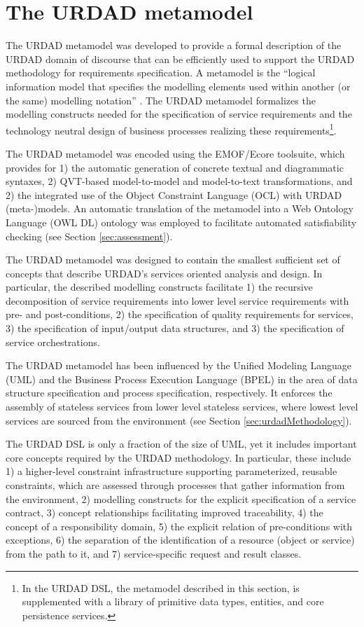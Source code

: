 \section{The URDAD metamodel \label{sec:metamodel}}

The URDAD metamodel was developed to provide a formal description of the URDAD domain of discourse that can be efficiently used to support the URDAD methodology for requirements specification. A metamodel is the ``logical information model that specifies the modelling elements used within another (or the same) modelling notation'' \cite{_ieee_2003}. The URDAD metamodel formalizes the modelling constructs needed for the specification of service requirements and the technology neutral design of business processes realizing these requirements\footnote{In the URDAD DSL, the metamodel described in this section, is supplemented with a library of primitive data types, entities, and core persistence services.}. 

The URDAD metamodel was encoded using the EMOF/Ecore \cite{} toolsuite, which provides for 1) the automatic generation of concrete textual and diagrammatic syntaxes, 2) QVT-based model-to-model and model-to-text transformations, and 2) the integrated use of the Object Constraint Language (OCL) \cite{_object_2010} with URDAD (meta-)models. An automatic translation of the metamodel into a Web Ontology Language (OWL DL) \cite{} ontology was employed to facilitate automated satisfiability checking (see Section \ref{sec:assessment}).

The URDAD metamodel was designed to contain the smallest sufficient set of concepts that describe URDAD's services oriented analysis and design. In particular, the described modelling constructs facilitate 1) the recursive decomposition of service requirements into lower level service requirements with pre- and post-conditions, 2) the specification of quality requirements for services, 3) the specification of input/output data structures, and 3) the specification of service orchestrations.

The URDAD metamodel has been influenced by the Unified Modeling Language (UML) and the Business Process Execution Language (BPEL) in the area of data structure specification and process specification, respectively. It enforces the assembly of stateless services from lower level stateless services, where lowest level services are sourced from the environment (see Section \ref{sec:urdadMethodology}). 

The URDAD DSL is only a fraction of the size of UML, yet it includes important core concepts required by the URDAD methodology. In particular, these include 1) a higher-level constraint infrastructure supporting parameterized, reusable constraints, which are assessed through processes that gather information from the environment, 2) modelling constructs for the explicit specification of a service contract, 3) concept relationships facilitating improved traceability, 4) the concept of a responsibility domain, 5) the explicit relation of pre-conditions with exceptions, 6) the separation of the identification of a resource (object or service) from the path to it, and 7) service-specific request and result classes.

